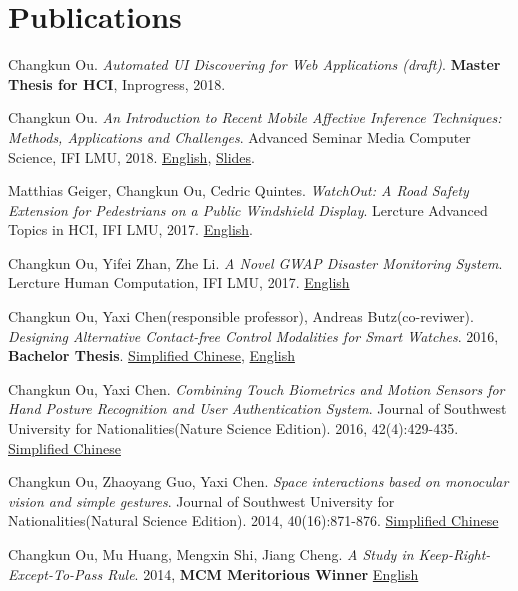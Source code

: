 \section{\textbf{Publications}}
 \resumeSubHeadingListStart
    \item{
      Changkun Ou.
      \emph{Automated UI Discovering for Web Applications (draft)}.
      \textbf{Master Thesis for HCI}, Inprogress, 2018.
    }
    \item{
      Changkun Ou.
      \emph{An Introduction to Recent Mobile Affective Inference Techniques: Methods, Applications and Challenges}.
      Advanced Seminar Media Computer Science, IFI LMU, 2018. \href{https://github.com/changkun/hs-ws17-mobile-emotion-inference/blob/master/src/lmumihs-ou.pdf}{English}, \href{https://github.com/changkun/hs-ws17-mobile-emotion-inference/blob/master/slides/presentation-final.pdf}{Slides}.
    }
    \item{
        Matthias Geiger, Changkun Ou, Cedric Quintes.
        \emph{WatchOut: A Road Safety Extension for Pedestrians on a Public Windshield Display}.
        Lercture Advanced Topics in HCI, IFI LMU, 2017. \href{https://github.com/changkun/ath-windshild-display/blob/master/paper/ath.pdf}{English}.
    }
    \item{
      Changkun Ou, Yifei Zhan, Zhe Li.
      \emph{A Novel GWAP Disaster Monitoring System}.
      Lercture Human Computation, IFI LMU, 2017.
      \href{https://github.com/changkun/hc-ss17-disaster-monitoring/blob/master/report/hc_final_project_report_team_Hotpot.pdf}{English}
    }
    \item{
        Changkun Ou, Yaxi Chen(responsible professor), Andreas Butz(co-reviwer).
        \emph{Designing Alternative Contact-free Control Modalities for Smart Watches}. 
        2016, \textbf{Bachelor Thesis}. \href{https://changkun.us/files/cv/bachelor-thesis-cn.html}{Simplified Chinese}, 
        \href{https://changkun.us/files/cv/bachelor-thesis-en.html}{English}
    }
    \item{
        Changkun Ou, Yaxi Chen. 
        \emph{Combining Touch Biometrics and Motion Sensors for Hand Posture Recognition and User Authentication System}. 
        Journal of Southwest University for Nationalities(Nature Science Edition). 
        2016, 42(4):429-435. \href{https://changkun.us/files/cv/touch.swun.html}{Simplified Chinese}
    }
    \item{
        Changkun Ou, Zhaoyang Guo, Yaxi Chen.
        \emph{Space interactions based on monocular vision and simple gestures}. 
        Journal of Southwest University for Nationalities(Natural Science Edition). 
        2014, 40(16):871-876. \href{https://changkun.us/files/cv/vision.swun.html}{Simplified Chinese}
    }
    \item{
        Changkun Ou, Mu Huang, Mengxin Shi, Jiang Cheng. 
        \emph{A Study in Keep-Right-Except-To-Pass Rule}. 
        2014, \textbf{MCM Meritorious Winner} \href{https://changkun.us/files/cv/28922.public.html}{English}
    }
 \resumeSubHeadingListEnd
